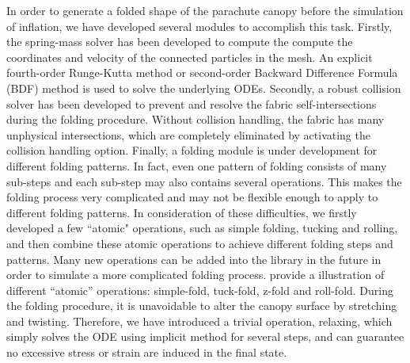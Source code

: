 In order to generate a folded shape of the parachute canopy before the simulation of inflation, we have developed several modules to accomplish this task. Firstly, the spring-mass solver has been developed to compute the compute the coordinates and velocity of the connected particles in the mesh. An explicit fourth-order Runge-Kutta method or second-order Backward Difference Formula (BDF) method is used to solve the underlying ODEs. Secondly, a robust collision solver has been developed to prevent and resolve the fabric self-intersections during the folding procedure. Without collision handling, the fabric has many unphysical intersections, which are completely eliminated by activating the collision handling option. Finally, a folding module is under development for different folding patterns. In fact, even one pattern of folding consists of many sub-steps and each sub-step may also contains several operations. This makes the folding process very complicated and may not be flexible enough to apply to different folding patterns. In consideration of these difficulties, we firstly developed a few ``atomic" operations, such as simple folding, tucking and rolling, and then combine these atomic operations to achieve different folding steps and patterns. Many new operations can be added into the library in the future in order to simulate a more complicated folding process.  provide a illustration of different ``atomic'' operations: simple-fold, tuck-fold, z-fold and roll-fold. During the folding procedure, it is unavoidable to alter the canopy surface by stretching and twisting. Therefore, we have introduced a trivial operation, relaxing, which simply solves the ODE using implicit method for several steps, and can guarantee no excessive stress or strain are induced in the final state. 

